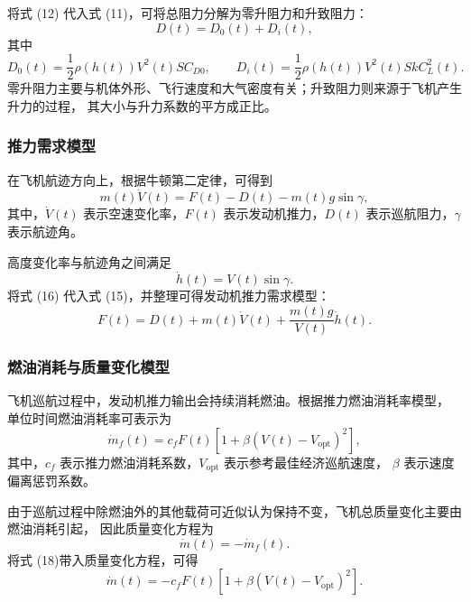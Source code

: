 \documentclass[UTF8]{ctexart}
\begin{document}
将式 (12) 代入式 (11)，可将总阻力分解为零升阻力和升致阻力：
\begin{equation}
    D(t)=D_0(t)+D_i(t),
    \label{eq:D_decompose}
\end{equation}
其中
\begin{equation}
    D_0(t)=\frac{1}{2}\rho(h(t))V^2(t)S C_{D0},
    \qquad
    D_i(t)=\frac{1}{2}\rho(h(t))V^2(t)S kC_L^2(t).
    \label{eq:D0_Di}
\end{equation}
零升阻力主要与机体外形、飞行速度和大气密度有关；升致阻力则来源于飞机产生升力的过程，
其大小与升力系数的平方成正比。\cite{7}

\subsubsection{推力需求模型}
在飞机航迹方向上，根据牛顿第二定律，可得到
\begin{equation}
    m(t)\dot V(t)
    =
    F(t)-D(t)-m(t)g\sin\gamma,
    \label{eq:force_balance}
\end{equation}
其中，$\dot V(t)$ 表示空速变化率，$F(t)$ 表示发动机推力，$D(t)$ 表示巡航阻力，$\gamma$ 表示航迹角。

高度变化率与航迹角之间满足
\begin{equation}
    \dot h(t)=V(t)\sin\gamma.
    \label{eq:h_dot}
\end{equation}
将式 (16) 代入式 (15)，并整理可得发动机推力需求模型：
\begin{equation}
    F(t)=D(t)+m(t)\dot V(t)
    +\frac{m(t)g}{V(t)}\dot h(t).
    \label{eq:thrust}
\end{equation}
\subsubsection{燃油消耗与质量变化模型}
飞机巡航过程中，发动机推力输出会持续消耗燃油。根据推力燃油消耗率模型，
单位时间燃油消耗率可表示为
\begin{equation}
    \dot m_f(t)
    =
    c_fF(t)
    \left[
    1+\beta\left(V(t)-V_{\mathrm{opt}}\right)^2
    \right],
    \label{eq:fuel_rate}
\end{equation}
其中，$c_f$ 表示推力燃油消耗系数，$V_{\mathrm{opt}}$ 表示参考最佳经济巡航速度，
$\beta$ 表示速度偏离惩罚系数。

由于巡航过程中除燃油外的其他载荷可近似认为保持不变，飞机总质量变化主要由燃油消耗引起，
因此质量变化方程为
\begin{equation}
    \dot m(t)=-\dot m_f(t).
    \label{eq:mass_change}
\end{equation}
将式 (18)带入质量变化方程，可得
\begin{equation}
    \dot m(t)
    =
    -c_fF(t)
    \left[
    1+\beta\left(V(t)-V_{\mathrm{opt}}\right)^2
    \right].
    \label{eq:mass_ode}
\end{equation}
\end{document}
